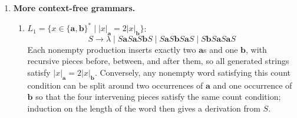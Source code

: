 \begin{enumerate}[{8.}1. ]
\begin{enumerate}
\item $L = \{x \in \{\pmb{a},\pmb{b}\}^* \mid |x|_{\pmb{a}} < |x|_{\pmb{b}}\}$:
\[
G: S \to E\pmb{b}E \mid E\pmb{b}S,\qquad E \to \pmb{a}E\pmb{b}E \mid \pmb{b}E\pmb{a}E \mid \lambda
\]
Here $E$ generates exactly the strings with equally many $\pmb{a}$'s and
$\pmb{b}$'s.  The nonterminal $S$ inserts one or more extra $\pmb{b}$'s between
balanced pieces, so every derived string has strictly more $\pmb{b}$'s than
$\pmb{a}$'s, and every such string can be decomposed in that way.

\item $G = \{x \in \{\pmb{a},\pmb{b}\}^* \mid |x|_{\pmb{a}} \geq |x|_{\pmb{b}}\}$:
\[
\begin{aligned}
S &\to E \mid A\\
E &\to \pmb{a}E\pmb{b}E \mid \pmb{b}E\pmb{a}E \mid \lambda\\
A &\to E\pmb{a}E \mid E\pmb{a}A.
\end{aligned}
\]
Again $E$ generates the balanced strings.  The nonterminal $A$ inserts one or
more extra $\pmb{a}$'s between balanced pieces, so it generates exactly the
strings with more $\pmb{a}$'s than $\pmb{b}$'s.  Therefore $S$ generates
exactly the strings with $|x|_{\pmb{a}} \ge |x|_{\pmb{b}}$.

\item $K = \{w \in \{\pmb{0},\pmb{1}\}^* \mid w = w^r\}$ (palindromes):
$S \to \pmb{0}S\pmb{0} \mid \pmb{1}S\pmb{1} \mid \pmb{0} \mid \pmb{1} \mid \lambda$.

\item $\Phi = \{\pmb{a}^j\pmb{b}^k\pmb{c}^m \mid j\geq 3, k=m\}$:
$S \to \pmb{aaa}AT$, $A \to \pmb{a}A \mid \lambda$, $T \to \pmb{b}T\pmb{c} \mid \lambda$.
\end{enumerate}

\item \textbf{More context-free grammars.}

\begin{enumerate}
\item $L_1 = \{x \in \{\pmb{a},\pmb{b}\}^* \mid |x|_{\pmb{a}} = 2|x|_{\pmb{b}}\}$:
\[
S \to \lambda
 \mid S\pmb{a}S\pmb{a}S\pmb{b}S
 \mid S\pmb{a}S\pmb{b}S\pmb{a}S
 \mid S\pmb{b}S\pmb{a}S\pmb{a}S
\]
Each nonempty production inserts exactly two $\pmb{a}$s and one $\pmb{b}$, with
recursive pieces before, between, and after them, so all generated strings
satisfy $|x|_{\pmb{a}} = 2|x|_{\pmb{b}}$.
Conversely, any nonempty word satisfying this count condition can be split
around two occurrences of $\pmb{a}$ and one occurrence of $\pmb{b}$ so that the
four intervening pieces satisfy the same count condition; induction on the
length of the word then gives a derivation from $S$.


\end{enumerate}
\end{enumerate}
